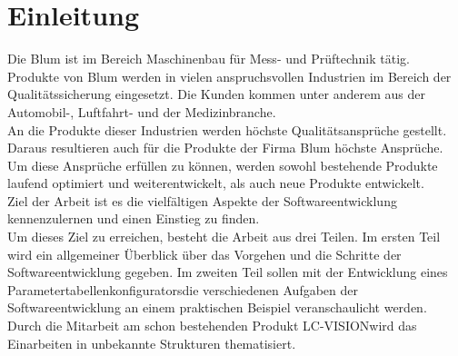 \documentclass[12pt,a4paper]{article}
\begin{document}
\section{Einleitung}
Die \ac{Blum} ist im Bereich Maschinenbau für Mess- und Prüftechnik tätig.\\
Produkte von \ac{Blum} werden in vielen anspruchsvollen Industrien im Bereich der Qualitätssicherung eingesetzt. Die Kunden kommen unter anderem aus der Automobil-, Luftfahrt- und der Medizinbranche. \\
An die Produkte dieser Industrien werden höchste Qualitätsansprüche gestellt. Daraus resultieren auch für die Produkte der Firma \ac{Blum} höchste Ansprüche. \\
Um diese Ansprüche erfüllen zu können, werden sowohl bestehende Produkte laufend optimiert und weiterentwickelt, als auch neue Produkte entwickelt. \\
Ziel der Arbeit ist es die vielfältigen Aspekte der Softwareentwicklung kennenzulernen und einen Einstieg zu finden.\\
Um dieses Ziel zu erreichen, besteht die Arbeit aus drei Teilen. Im ersten Teil wird ein allgemeiner Überblick über das Vorgehen und die Schritte der Softwareentwicklung gegeben. Im zweiten Teil sollen mit der Entwicklung eines \glqq Parametertabellenkonfigurators\grqq\space die verschiedenen Aufgaben der Softwareentwicklung an einem praktischen Beispiel veranschaulicht werden.
Durch die Mitarbeit am schon bestehenden Produkt \glqq LC-VISION\grqq\space wird das Einarbeiten in unbekannte Strukturen thematisiert. 
\newpage   



\newpage


\end{document}
